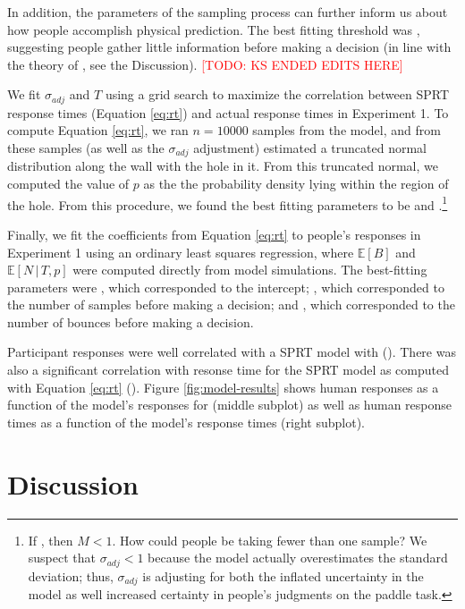 \documentclass[10pt,letterpaper]{article}
\newcommand{\TODO}[1]{\textcolor{red}{[TODO: #1]}}
\begin{document}
In addition, the parameters of the sampling process can further inform us about how people accomplish physical prediction. The best fitting threshold was \threshold{}, suggesting people gather little information before making a decision (in line with the theory of \cite{Vul:2014ba}, see the Discussion). \TODO{KS ENDED EDITS HERE}

We fit $\sigma_{adj}$ and $T$ using a grid search to maximize the correlation between SPRT response times (Equation \ref{eq:rt}) and actual response times in Experiment 1. To compute Equation \ref{eq:rt}, we ran $n=10000$ samples from the model, and from these samples (as well as the $\sigma_{adj}$ adjustment) estimated a truncated normal distribution along the wall with the hole in it. From this truncated normal, we computed the value of $p$ as the the probability density lying within the region of the hole. From this procedure, we found the best fitting parameters to be \sdadj{} and \threshold{}.\footnote{If \sdadj{}, then $M<1$. How could people be taking fewer than one sample? We suspect that $\sigma_{adj}<1$ because the model actually overestimates the standard deviation; thus, $\sigma_{adj}$ is adjusting for both the inflated uncertainty in the model as well increased certainty in people's judgments on the paddle task.}

Finally, we fit the coefficients from Equation \ref{eq:rt} to people's responses in Experiment 1 using an ordinary least squares regression, where $\mathbb{E}[B]$ and $\mathbb{E}[N\,|\,T,p]$ were computed directly from model simulations. The best-fitting parameters were \betazero{}, which corresponded to the intercept; \betaone{}, which corresponded to the number of samples before making a decision; and \betatwo{}, which corresponded to the number of bounces before making a decision.

Participant responses were well correlated with a SPRT model with \threshold{} (\HoleResponseCorr{}). There was also a significant correlation with resonse time for the \threshold{} SPRT model as computed with Equation \ref{eq:rt} (\HoleRTCorr{}). Figure \ref{fig:model-results} shows human responses as a function of the model's responses for \threshold{} (middle subplot) as well as human response times as a function of the model's response times (right subplot).

\section{Discussion}
\end{document}
